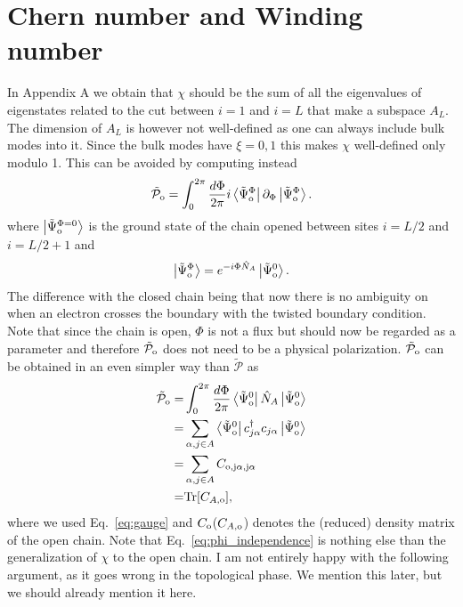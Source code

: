 \documentclass[twocolumn,amsmath,longbibliography,amssymb,superscriptaddress]{revtex4-1}
\newcommand{\maria}[1]{{\color{blue} #1}}
\newcommand{\tpo}{\tilde{\mathcal{P}}_{\rm o}}
\newcommand{\brapsio}[1]{\bra{\tilde{\Psi}_{{\rm o}}^#1}}
\newcommand{\ketpsio}[1]{\ket{\tilde{\Psi}_{{\rm o}}^#1}}
\begin{document}

\section{Chern number and Winding number}


In Appendix A we obtain that $\chi$ should be the sum of all the eigenvalues of eigenstates related to the cut between $i=1$ and $i=L$ that make a subspace $A_L$. The dimension of $A_L$ is however not well-defined as one can always include bulk modes into it. Since the bulk modes have $\xi = 0,1$ this makes $\chi$ well-defined only modulo 1. This can be avoided by computing instead
\begin{equation}\label{eq:tpo}
\tpo = \int_0^{2\pi}\frac{d\Phi}{2\pi} i\brapsio{\Phi}\partial_\Phi \ketpsio{\Phi}.
\end{equation}
where $\ketpsio{{\Phi=0}}$ is the ground state of the chain opened between sites $i=L/2$ and $i=L/2+1$ and 
\begin{equation}
\ketpsio{\Phi} =e^{-i \Phi \hat{N}_A} \ketpsio{0}.
\label{eq:gauge}
\end{equation}
The difference with the closed chain being that now there is no ambiguity on when an electron crosses the boundary with the twisted boundary condition. Note that since the chain is open, $\Phi$ is not a flux but should now be regarded as a parameter and therefore $\tpo$ does not need to be a physical polarization.  $\tpo$ can be obtained in an even simpler way than $\tilde{\mathcal{P}}$ as 
\begin{align}\label{eq:phi_independence}
\tpo =&  \int_0^{2\pi}\frac{d\Phi}{2\pi} \brapsio{0} \hat{N}_A \ketpsio{0} \nonumber \\
=&\sum_{\alpha,j\in A}\brapsio{0} c_{j\alpha}^\dagger c_{j\alpha} \ketpsio{0} \nonumber\\
=&\sum_{\alpha,j\in A} C_{\rm o,j\alpha,j\alpha}\nonumber \\
=& {\rm Tr}[C_{A,\rm o}],
\end{align}
where we used Eq.~\eqref{eq:gauge} and $C_{\rm o}$($C_{A,\rm o}$) denotes the (reduced) density matrix of the open chain. 
Note that Eq.~\eqref{eq:phi_independence} is nothing else than the generalization of $\chi$ to the open chain. 
\maria{I am not entirely happy with the following argument, as it goes wrong in the topological phase. We mention this later, but we should already mention it here. }
\end{document}
